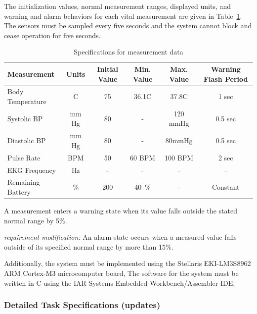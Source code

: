 \documentclass[12pt]{article} %
\begin{document}
The initialization values, normal measurement ranges, displayed units, and 
warning and alarm behaviors for each vital measurement are given in 
Table~\ref{tab:sensorDefs}. The sensors must be sampled every five seconds and the system cannot block and cease operation for five seconds.

\begin{table}[h]
  \centering
  \begin{tabular}{|l|*{5}{c}|}
    \hline
    Measurement & Units & Initial Value & Min. Value & Max. Value & Warning Flash Period \\ \hline
    Body Temperature & C & 75 & 36.1C & 37.8C & 1 sec \\ \hline
    Systolic BP & mm Hg & 80 & - & 120 mmHg & 0.5 sec \\ \hline
    Diastolic BP & mm Hg & 80 & - & 80mmHg & 0.5 sec \\ \hline
    Pulse Rate & BPM & 50 & 60 BPM & 100 BPM & 2 sec \\ \hline
		EKG Frequency & Hz & - & - & - & - \\ \hline
    Remaining Battery & \% & 200 & 40~\% & - & Constant \\ \hline
  \end{tabular}
  \caption{Specifications for measurement data}
  \label{tab:sensorDefs}
\end{table}

A measurement enters a warning state when its value falls outside the stated 
normal range by 5\%. 

\emph{requirement modification: }An alarm state occurs when a measured value
falls outside of its specified normal range by more than 15\%.

Additionally, the system must be implemented using the Stellaris 
EKI-LM3S8962 ARM Cortex-M3 microcomputer board, The software for the system 
must be written in C using the IAR Systems Embedded Workbench/Assembler IDE.

\subsubsection{Detailed Task Specifications (updates)}
\end{document}
